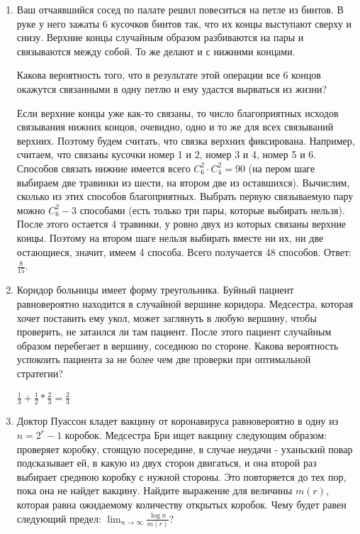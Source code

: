 \documentclass[12pt]{article}
\newenvironment{solution}{}{}
\begin{document}
\begin{enumerate}
    \item Ваш отчаявшийся сосед по палате решил повеситься на петле из бинтов. В руке у него зажаты 6 кусочков бинтов так, что их концы выступают сверху и снизу. Верхние концы случайным образом разбиваются на пары и связываются между собой. То же делают и с нижними концами. 
    
    Какова вероятность того, что в результате этой операции все 6 концов окажутся связанными в одну петлю и ему удастся вырваться из жизни?
    
\begin{solution}
    Если верхние концы уже как-то связаны, то число благоприятных исходов связывания нижних концов, очевидно, одно и то же для всех связываний верхних. Поэтому будем считать, что связка верхних фиксирована. Например, считаем, что связаны кусочки номер 1 и 2, номер 3 и 4, номер 5 и 6. Способов связать нижние имеется всего $C_6^2 \cdot C_4^2 = 90$ (на пером шаге выбираем две травинки из шести, на втором две из оставшихся). Вычислим, сколько из этих способов благоприятных. Выбрать первую связываемую пару можно $C_6^2 - 3$ способами (есть только три пары, которые выбирать нельзя). После этого остается 4 травинки, у ровно двух из которых связаны верхние концы. Поэтому на втором шаге нельзя выбирать вместе ни их, ни две остающиеся, значит, имеем 4 способа. Всего получается 48 способов. Ответ: $\frac{8}{15}$.
\end{solution}

    \item Коридор больницы имеет форму треугольника. Буйный пациент равновероятно находится в случайной вершине коридора. Медсестра, которая хочет поставить ему укол, может заглянуть в любую вершину, чтобы проверить, не затаился ли там пациент. После этого пациент случайным образом перебегает в вершину, соседнюю по стороне. Какова вероятность успокоить пациента за не более чем две проверки при оптимальной стратегии?
    
\begin{solution}
$\frac{1}{3} + \frac{1}{2} * \frac{2}{3} = \frac{2}{3}$
\end{solution}
    
    \item Доктор Пуассон кладет вакцину от коронавируса равновероятно в одну из $n=2^r-1$ коробок. Медсестра Бри ищет вакцину следующим образом: проверяет коробку, стоящую посередине, в случае неудачи - уханьский повар подсказывает ей, в какую из двух сторон двигаться, и она второй раз выбирает среднюю коробку с нужной стороны. Это повторяется до тех пор, пока она не найдет вакцину. Найдите выражение для величины $m(r)$, которая равна ожидаемому количеству открытых коробок. Чему будет равен следующий предел: $\lim_{n \to \infty} \frac{\log n}{m(r)}$?
    

\end{enumerate}
\end{document}
